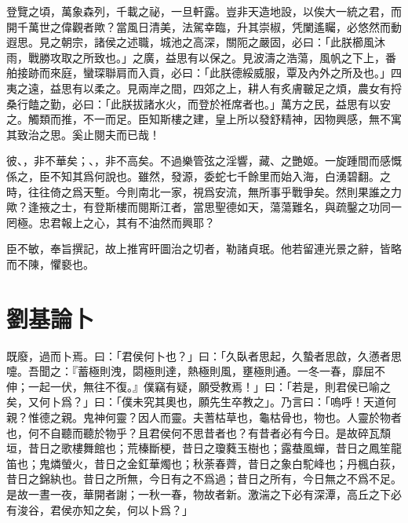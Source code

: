 登覽之頃，萬象森列，千載之祕，一旦軒露。豈非天造地設，以俟{大}一統之君，而開千萬世之偉觀者歟？當風日清美，法駕幸臨，升其崇椒，凭闌遙矚，必悠然而動遐思。見之朝宗，諸侯之述職，城池之高深，關阨之嚴固，必曰：「此朕櫛風沐雨，戰勝攻取之所致也。」之廣，益思有以保之。見波濤之浩蕩，風帆之下上，番舶接跡而來庭，蠻琛聯肩而入貢，必曰：「此朕德綏威服，覃及內外之所及也。」四{夷}之遠，益思有以柔之。見兩岸之間，四郊之上，耕人有炙膚皸足之煩，農女有捋桑行饁之勤，必曰：「此朕拔諸水火，而登於袵席者也。」萬方之民，益思有以安之。觸類而{推}，不一而足。臣知斯樓之建，皇上所以發舒精神，因物興感，無不寓其致治之思。奚止閱夫而已哉！%

彼、，非不華矣；、，非不高矣。不過樂管弦之淫響，藏、之艷姬。{一}旋踵間而感慨係之，臣不知其爲何說也。雖然，發源，委蛇七千餘里而始入海，白湧碧翻。之時，往往倚之爲天塹。今則南北一家，視爲安流，無所事乎戰爭矣。然則果誰之力歟？逢掖之士，有登斯樓而閱斯江者，當思聖德如天，蕩蕩難名，與疏鑿之功同一罔極。忠君報上之心，其有不油然而興耶？%

臣不敏，奉旨撰記，故上推宵旰圖治之{切}者，勒諸貞珉。他若留連光景之辭，皆略而不陳，懼褻也。%

\theendnotes

\section[司馬季主論卜\quad{\small 劉基}]{{\normalsize 劉基}\quad {}論卜}
既廢，過而卜焉。曰：「君侯何卜也？」曰：「久臥者思起，久蟄者思啟，久懣者思嚏。吾聞之：『蓄極則洩，閟極則達，熱極則風，壅極則通。一冬一春，靡屈不伸；一起一伏，無往不復。』僕竊有疑，願受教焉！」曰：「若是，則君侯已喻之矣，又何卜爲？」曰：「僕未究其奧也，願先生卒教之」。乃言曰：「嗚呼！天道何親？惟德之親。鬼神何靈？因人而靈。夫蓍枯草也，龜枯骨也，物也。人靈於物者也，何不自聽而聽於物乎？且君侯何不思昔者也？有昔者必有今日。是故碎瓦頹垣，昔日之歌樓舞館也；荒榛斷梗，昔日之瓊蕤玉樹也；露{蛬}風蟬，昔日之鳳笙龍笛也；鬼燐螢火，昔日之金{釭}華燭也；秋荼春薺，昔日之象白駝峰也；丹楓白荻，昔日之錦紈也。昔日之所無，今日有之不爲過；昔日之所有，今日無之不爲不足。是故一晝一夜，華開者謝；{一秋一春}，物故者新。激湍之下必有深潭，高丘之下必有浚谷，君侯亦知之矣，何以卜爲？」%

